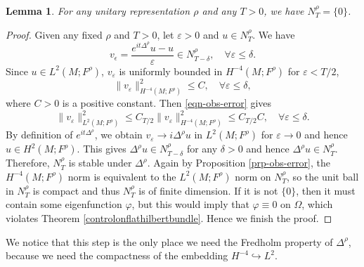 \documentclass[11pt,oneside,reqno]{amsart}
\newtheorem{lemma}[theorem]{Lemma}
\theoremstyle{definition}
\numberwithin{equation}{section}
\theoremstyle{plain}
\begin{document}
 \begin{lemma}
     For any unitary representation $\rho$ and any $T>0$, we have $N^\rho_T=\lbrace 0\rbrace$.
 \end{lemma}
 \begin{proof}
     Given any fixed $\rho$ and $T>0$, let $\varepsilon>0$ and $u\in N_T^\rho$. We have
     \begin{equation*}
         v_\epsilon =\frac{e^{it\Delta^\rho} u-u}{\varepsilon} \in N_{T-\delta}^\rho, \quad \forall \varepsilon\le \delta.
     \end{equation*}
     Since $u\in L^2(M;F^\rho)$, $v_\varepsilon$ is uniformly bounded in $H^{-4}(M;F^\rho)$ for $\varepsilon<T/2$,
     \begin{equation*}
         \|v_\varepsilon\|^2_{H^{-4}(M;F^\rho)}\le C ,\quad \forall \varepsilon\le \delta,
     \end{equation*}
     where $C>0$ is a positive constant. Then \eqref{eqn-obs-error} gives
     \begin{equation*}
         \|v_\varepsilon\|_{L^2(M;F^\rho)}^2\le C_{T/2} \|v_{\varepsilon}\|^2_{H^{-4}(M;F^\rho)}\le C_{T/2}C,\quad \forall \varepsilon\le \delta.
     \end{equation*}  
     By definition of $e^{it\Delta^\rho}$, we obtain $v_\varepsilon \to i\Delta^\rho u$ in $ L^2(M;F^\rho)$ for $\varepsilon\to 0$ and hence $u\in H^2(M;F^\rho)$. This gives $\Delta^\rho u\in N_{T-\delta}^\rho$ for any $\delta>0$ and hence $\Delta^\rho u \in N_T^\rho$. Therefore, $N_T^\rho$ is stable under $\Delta^\rho$. Again by Proposition \ref{prp-obs-error}, the $H^{-4}(M;F^\rho)$ norm is equivalent to the $L^2(M;F^\rho)$ norm on $N_T^\rho$, so the unit ball in $N_T^\rho$ is compact and thus $N_T^\rho$ is of finite dimension. If it is not $\lbrace 0\rbrace$, then it must contain some eigenfunction $\varphi$, but this would imply that $\varphi\equiv 0$ on $\Omega$, which violates Theorem \ref{controlonflathilbertbundle}. Hence we finish the proof.  
 \end{proof}
We notice that this step is the only place we need the Fredholm property of $\Delta^{\rho}$, because we need the compactness of the embedding $H^{-4} \hookrightarrow L^2$. 
\end{document}
